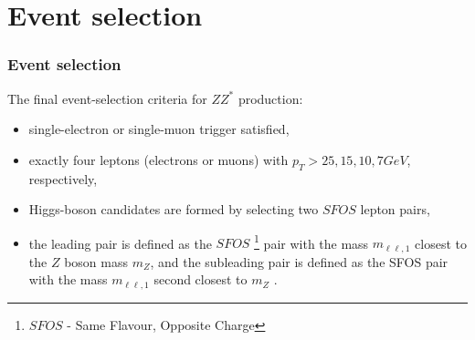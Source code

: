 \documentclass[aspectratio=1610, english]{beamer}
\begin{document}
\section{Event selection}

\begin{frame}
\frametitle{Event selection}
The final event-selection criteria for $ZZ^*$ production:

\begin{itemize}
\item single-electron or single-muon trigger satisfied,
\item exactly four leptons (electrons or muons) with $p_T>25, 15, 10, 7 GeV$, respectively,
\item Higgs-boson candidates are formed by selecting two $SFOS$ lepton pairs,
\item the leading pair is defined as the $SFOS$ \footnote{$SFOS$ - Same Flavour, Opposite Charge} pair with the mass $m_{\ell \ell, 1}$ closest to the $Z$ boson mass $m_Z$, and the subleading pair is defined as the SFOS pair with the mass $m_{\ell \ell, 1}$ second closest to $m_Z$ \cite{opendata}.

\end{itemize}

\end{frame}
\end{document}
